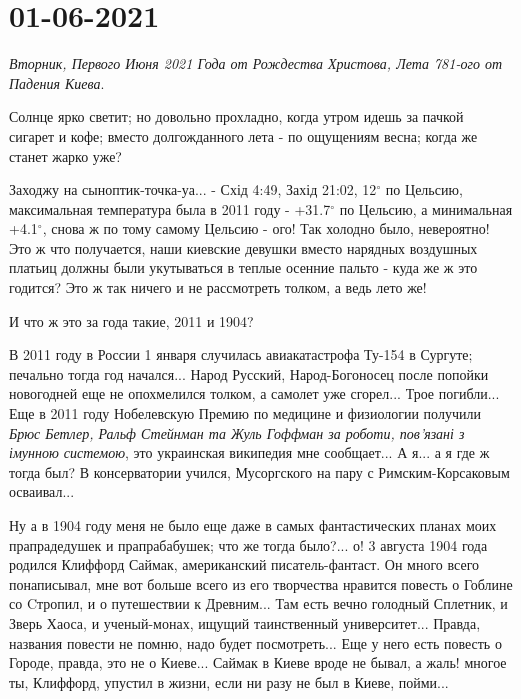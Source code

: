  
 
 
 
 
\section{01-06-2021}

\emph{Вторник, Первого Июня 2021 Года от Рождества Христова, Лета 781-ого от Падения Киева}.

Солнце ярко светит; но довольно прохладно, когда утром идешь за пачкой сигарет
и кофе; вместо долгожданного лета - по ощущениям весна; когда же станет жарко
уже?

Заходжу на сыноптик-точка-уа... - Схід 4:49, Захід 21:02, 12$^{\circ}$ по
Цельсию, максимальная температура была в 2011 году - +31.7$^{\circ}$ по
Цельсию, а минимальная +4.1$^{\circ}$, снова ж по тому самому Цельсию - ого!
Так холодно было, невероятно! Это ж что получается, наши киевские девушки
вместо нарядных воздушных платьиц должны были укутываться в теплые осенние
пальто - куда же ж это годится? Это ж так ничего и не рассмотреть толком, а
ведь лето же!

И что ж это за года такие, 2011 и 1904?

В 2011 году в России 1 января случилась авиакатастрофа Ту-154 в Сургуте;
печально тогда год начался... Народ Русский, Народ-Богоносец после попойки
новогодней еще не опохмелился толком, а самолет уже сгорел... Трое погибли...
Еще в 2011 году Нобелевскую Премию по медицине и физиологии получили \emph{Брюс
Бетлер, Ральф Стейнман та Жуль Гоффман за роботи, пов'язані з імунною
системою}, это украинская википедия мне сообщает...  А я... а я где ж тогда
был? В консерватории учился, Мусоргского на пару с Римским-Корсаковым
осваивал...

Ну а в 1904 году меня не было еще даже в самых фантастических планах моих
прапрадедушек и прапрабабушек; что же тогда было?... о! 3 августа 1904 года
родился Клиффорд Саймак, американский писатель-фантаст. Он много всего
понаписывал, мне вот больше всего из его творчества нравится повесть о Гоблине
со Cтропил, и о путешествии к Древним... Там есть вечно голодный Сплетник, и
Зверь Хаоса, и ученый-монах, ищущий таинственный университет... Правда,
названия повести не помню, надо будет посмотреть...  Еще у него есть повесть о
Городе, правда, это не о Киеве... Саймак в Киеве вроде не бывал, а жаль! многое
ты, Клиффорд, упустил в жизни, если ни разу не был в Киеве, пойми...

